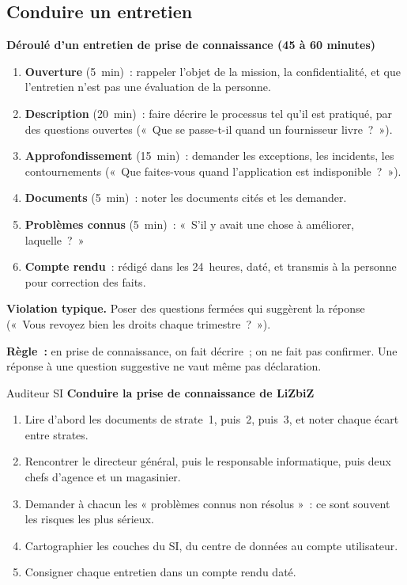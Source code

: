 \subsection{Conduire un entretien}

\begin{boxprocedure}
\textbf{Déroulé d'un entretien de prise de connaissance (45 à 60 minutes)}
\begin{enumerate}
    \item \textbf{Ouverture} (5~min)~: rappeler l'objet de la mission, la
          confidentialité, et que l'entretien n'est pas une évaluation de la
          personne.
    \item \textbf{Description} (20~min)~: faire décrire le processus tel
          qu'il est pratiqué, par des questions ouvertes («~Que se passe-t-il
          quand un fournisseur livre~?~»).
    \item \textbf{Approfondissement} (15~min)~: demander les exceptions,
          les incidents, les contournements («~Que faites-vous quand
          l'application est indisponible~?~»).
    \item \textbf{Documents} (5~min)~: noter les documents cités et les
          demander.
    \item \textbf{Problèmes connus} (5~min)~: «~S'il y avait une chose à
          améliorer, laquelle~?~»
    \item \textbf{Compte rendu}~: rédigé dans les 24~heures, daté, et
          transmis à la personne pour correction des faits.
\end{enumerate}
\end{boxprocedure}

\begin{boxalert}
\textbf{Violation typique.} Poser des questions fermées qui suggèrent la
réponse («~Vous revoyez bien les droits chaque trimestre~?~»).

\smallskip
\textbf{Règle~:} en prise de connaissance, on fait décrire~; on ne fait pas
confirmer. Une réponse à une question suggestive ne vaut même pas
déclaration.
\end{boxalert}

\begin{boxmetier}{Auditeur SI}
\textbf{Conduire la prise de connaissance de LiZbiZ}
\begin{enumerate}
    \item Lire d'abord les documents de strate~1, puis~2, puis~3, et noter
          chaque écart entre strates.
    \item Rencontrer le directeur général, puis le responsable informatique,
          puis deux chefs d'agence et un magasinier.
    \item Demander à chacun les « problèmes connus non résolus »~: ce sont
          souvent les risques les plus sérieux.
    \item Cartographier les couches du SI, du centre de données au compte
          utilisateur.
    \item Consigner chaque entretien dans un compte rendu daté.
\end{enumerate}
\end{boxmetier}

